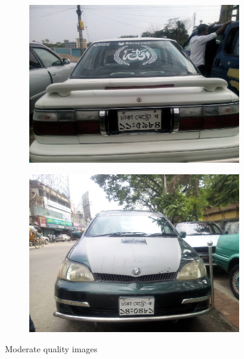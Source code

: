 \documentclass{standalone}
\begin{document}
\begin{figure}
\begin{subfigure}{0.5\textwidth}
    \centering
    \includegraphics[width=0.9\linewidth]{./img/experiment/stage.1/good2}
\end{subfigure}
\begin{subfigure}{0.5\textwidth}
    \centering
    \includegraphics[width=0.9\linewidth]{./img/experiment/stage.1/good3}
\end{subfigure}
\caption{Moderate quality images}
\end{figure}
\end{document}
